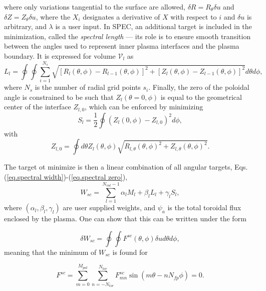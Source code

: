 where only variations tangential to the surface are allowed, $\delta R = R_\theta\delta u$ and $\delta Z = Z_\theta\delta u$, where the $X_i$ designates a derivative of $X$ with respect to $i$ and $\delta u$ is arbitrary, and $\lambda$ is a user input. In SPEC, an additional target is included in the minimization, called the \emph{spectral length} --- its role is to ensure smooth transition between the angles used to represent inner plasma interfaces and the plasma boundary. It is expressed for volume $\mathcal{V}_l$ as 
\begin{equation}
	L_l = \oint\oint\sum_{i=1}^{N_s}\sqrt{[R_l(\theta,\phi)-R_{l-1}(\theta,\phi)]^2 +  [Z_l(\theta,\phi)-Z_{l-1}(\theta,\phi)]^2}d\theta d\phi, \label{eq.spectral length}
\end{equation}
where $N_s$ is the number of radial grid points $s_i$. Finally, the zero of the poloidal angle is constrained to be such that ${Z}_l(\theta=0,\phi)$ is equal to the geometrical center of the interface $Z_{l,0}$, which can be enforced by minimizing
\begin{equation}
	S_l = \frac{1}{2}\oint ({Z}_l(0,\phi) - Z_{l,0})^2 d\phi, \label{eq.spectral zero}
\end{equation}
with
\begin{equation}
	Z_{l,0} = \oint d\theta Z_l(\theta,\phi)\sqrt{R_{l,\theta}(\theta,\phi)^2 + Z_{l,\theta}(\theta,\phi)^2}.
\end{equation}

The target ot minimize is then a linear combination of all angular targets, Eqs.(\ref{eq.spectral width})-(\ref{eq.spectral zero}),
\begin{equation}
	W_{sc} = \sum_{l=1}^{N_{vol}-1} \alpha_lM_l + \beta_lL_l + \gamma_l S_l,
\end{equation}
where $(\alpha_l,\beta_l,\gamma_l)$ are user supplied weights, and $\psi_a$ is the total toroidal flux enclosed by the plasma. One can show that this can be written under the form

\begin{equation}
	\delta W_{sc} = \oint\oint F^{sc}(\theta,\phi) \delta u d\theta d\phi,
\end{equation}
meaning that the minimum of $W_{sc}$ is found for 

\begin{equation}
	F^{sc} = \sum_{m=0}^{M_{pol}} \sum_{n=-N_{tor}}^{N_{tor}} F^{sc}_{mn} \sin(m\theta-nN_{fp}\phi) = 0. \label{eq. spectral constraint}
\end{equation}

